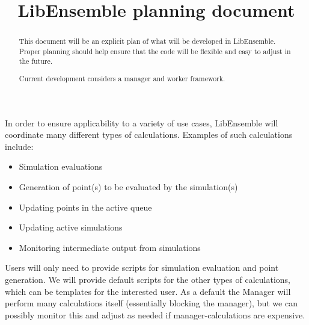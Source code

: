 \documentclass{article}
\title{LibEnsemble planning document}
\begin{document}
\maketitle
\begin{abstract}
  This document will be an explicit plan of what will be developed in
  LibEnsemble. Proper planning should help ensure that the code will be flexible
  and easy to adjust in the future.

  Current development considers a manager and worker framework. 
\end{abstract}

In order to ensure applicability to a variety of use cases, 
LibEnsemble will coordinate many different types of calculations. Examples of
such calculations include:
\begin{itemize}
  \item Simulation evaluations
  \item Generation of point(s) to be evaluated by the simulation(s)
  \item Updating points in the active queue
  \item Updating active simulations
  \item Monitoring intermediate output from simulations
\end{itemize}
Users will only need to provide scripts for simulation evaluation and point
generation. We will provide default scripts for the other types of calculations, 
which can be templates for the interested user. As a default the Manager will
perform many calculations itself (essentially blocking the manager), but we can
possibly monitor this and adjust as needed if manager-calculations are
expensive. 
\end{document}
